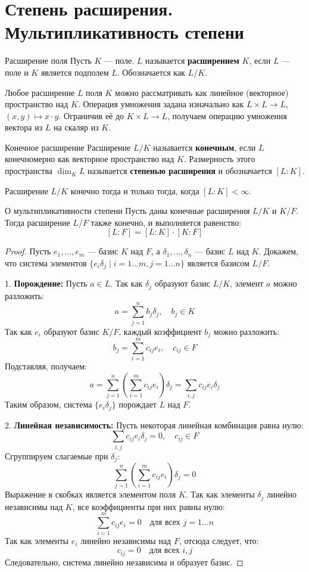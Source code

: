 
\section{Степень расширения. Мультипликативность степени}

\begin{Definition}{Расширение поля}{}
	Пусть $K$ --- поле.
	$L$ называется \textbf{расширением} $K$, если $L$ --- поле и $K$ является подполем $L$. Обозначается как $L/K$.
\end{Definition}

Любое расширение $L$ поля $K$ можно рассматривать как линейное (векторное) пространство над $K$.
Операция умножения задана изначально как $L \times L \to L$, $(x,y) \mapsto x \cdot y$.
Ограничив её до $K \times L \to L$, получаем операцию умножения вектора из $L$ на скаляр из $K$.

\begin{Definition}{Конечное расширение}{}
	Расширение $L/K$ называется \textbf{конечным}, если $L$ конечномерно как векторное пространство над $K$.
	Размерность этого пространства $\dim_K L$ называется \textbf{степенью расширения} и обозначается $[L:K]$.
\end{Definition}

Расширение $L/K$ конечно тогда и только тогда, когда $[L:K] < \infty$.

\begin{Theorem}{О мультипликативности степени}{}
	Пусть даны конечные расширения $L/K$ и $K/F$. Тогда расширение $L/F$ также конечно, и выполняется равенство:
	\[ [L:F] = [L:K] \cdot [K:F] \]
\end{Theorem}

\begin{proof}
	Пусть $e_1, \dots, e_m$ --- базис $K$ над $F$, а $\delta_1, \dots, \delta_n$ --- базис $L$ над $K$. Докажем, что система элементов $\{ e_i \delta_j \mid i=1\dots m, j=1\dots n \}$ является базисом $L/F$.

	1. \textbf{Порождение:} Пусть $a \in L$. Так как $\delta_j$ образуют базис $L/K$, элемент $a$ можно разложить:
	\[ a = \sum_{j=1}^n b_j \delta_j, \quad b_j \in K \]
	Так как $e_i$ образуют базис $K/F$, каждый коэффициент $b_j$ можно разложить:
	\[ b_j = \sum_{i=1}^m c_{ij} e_i, \quad c_{ij} \in F \]
	Подставляя, получаем:
	\[ a = \sum_{j=1}^n \left( \sum_{i=1}^m c_{ij} e_i \right) \delta_j = \sum_{i,j} c_{ij} e_i \delta_j \]
	Таким образом, система $\{ e_i \delta_j \}$ порождает $L$ над $F$.

	2. \textbf{Линейная независимость:} Пусть некоторая линейная комбинация равна нулю:
	\[ \sum_{i,j} c_{ij} e_i \delta_j = 0, \quad c_{ij} \in F \]
	Сгруппируем слагаемые при $\delta_j$:
	\[ \sum_{j=1}^n \left( \sum_{i=1}^m c_{ij} e_i \right) \delta_j = 0 \]
	Выражение в скобках является элементом поля $K$. Так как элементы $\delta_j$ линейно независимы над $K$, все коэффициенты при них равны нулю:
	\[ \sum_{i=1}^m c_{ij} e_i = 0 \quad \text{для всех } j=1\dots n \]
	Так как элементы $e_i$ линейно независимы над $F$, отсюда следует, что:
	\[ c_{ij} = 0 \quad \text{для всех } i, j \]
	Следовательно, система линейно независима и образует базис.
\end{proof}
